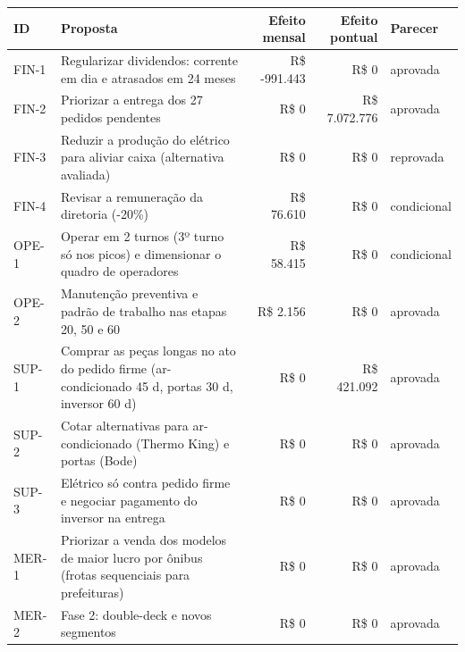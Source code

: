 \begin{tabular}{@{}p{}p{}rrp{}@{}}
\toprule
\textbf{ID} & \textbf{Proposta} & \textbf{Efeito mensal} & \textbf{Efeito pontual} & \textbf{Parecer} \\
\midrule
FIN-1 & Regularizar dividendos: corrente em dia e atrasados em 24 meses & R\$ -991.443 & R\$ 0 & aprovada \\
FIN-2 & Priorizar a entrega dos 27 pedidos pendentes & R\$ 0 & R\$ 7.072.776 & aprovada \\
FIN-3 & Reduzir a produção do elétrico para aliviar caixa (alternativa avaliada) & R\$ 0 & R\$ 0 & reprovada \\
FIN-4 & Revisar a remuneração da diretoria (-20\%) & R\$ 76.610 & R\$ 0 & condicional \\
OPE-1 & Operar em 2 turnos (3º turno só nos picos) e dimensionar o quadro de operadores & R\$ 58.415 & R\$ 0 & condicional \\
OPE-2 & Manutenção preventiva e padrão de trabalho nas etapas 20, 50 e 60 & R\$ 2.156 & R\$ 0 & aprovada \\
SUP-1 & Comprar as peças longas no ato do pedido firme (ar-condicionado 45 d, portas 30 d, inversor 60 d) & R\$ 0 & R\$ 421.092 & aprovada \\
SUP-2 & Cotar alternativas para ar-condicionado (Thermo King) e portas (Bode) & R\$ 0 & R\$ 0 & aprovada \\
SUP-3 & Elétrico só contra pedido firme e negociar pagamento do inversor na entrega & R\$ 0 & R\$ 0 & aprovada \\
MER-1 & Priorizar a venda dos modelos de maior lucro por ônibus (frotas sequenciais para prefeituras) & R\$ 0 & R\$ 0 & aprovada \\
MER-2 & Fase 2: double-deck e novos segmentos & R\$ 0 & R\$ 0 & aprovada \\
\bottomrule
\end{tabular}
